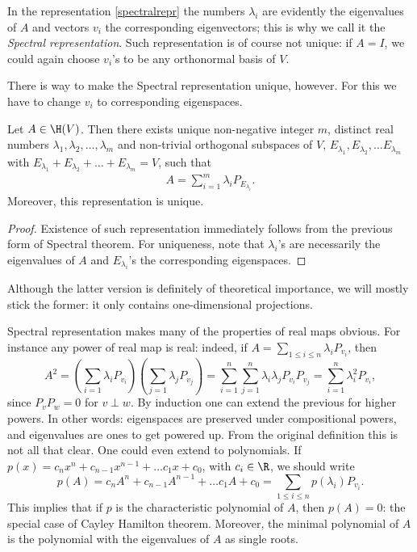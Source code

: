 In the representation \ref{spectralrepr} the numbers $\lambda_{i}$ are evidently the eigenvalues of $A$ and vectors $v_{i}$ the corresponding eigenvectors; this is why we call it the \textit{Spectral representation}. Such representation is of course not unique: if $A = I$, we could again choose $v_{i}$'s to be any orthonormal basis of $V$.

There is way to make the Spectral representation unique, however. For this we have to change $v_{i}$ to corresponding eigenspaces.

\begin{lause}
	Let $A \in \H(V)$. Then there exists unique non-negative integer $m$, distinct real numbers $\lambda_{1}, \lambda_{2}, \ldots, \lambda_{m}$ and non-trivial orthogonal subspaces of $V$, $E_{\lambda_{1}}, E_{\lambda_{2}}, \ldots E_{\lambda_{m}}$ with $E_{\lambda_{1}} + E_{\lambda_{2}} + \ldots + E_{\lambda_{m}} = V$, such that
	\begin{align*}\label{spectralrepr2}
		A = \sum_{i = 1}^{m} \lambda_{i} P_{E_{\lambda_{i}}}.
	\end{align*}
	Moreover, this representation is unique.
\end{lause}
\begin{proof}
	Existence of such representation immediately follows from the previous form of Spectral theorem. For uniqueness, note that $\lambda_{i}$'s are necessarily the eigenvalues of $A$ and $E_{\lambda_{i}}$'s the corresponding eigenspaces.
\end{proof}

Although the latter version is definitely of theoretical importance, we will mostly stick the former: it only contains one-dimensional projections.

Spectral representation makes many of the properties of real maps obvious. For instance any power of real map is real: indeed, if $A = \sum_{1 \leq i \leq n} \lambda_{i} P_{v_{i}}$, then
\[
	A^{2} = \left(\sum_{i = 1} \lambda_{i} P_{v_{i}}\right) \left(\sum_{j = 1} \lambda_{j} P_{v_{j}}\right) = \sum_{i = 1}^{n} \sum_{j = 1}^{n}\lambda_{i} \lambda_{j} P_{v_{i}} P_{v_{j}} = \sum_{i = 1}^{n} \lambda_{i}^2 P_{v_{i}},
\]
since $P_{v} P_{w} = 0$ for $v \perp w$. By induction one can extend the previous for higher powers. In other words: eigenspaces are preserved under compositional powers, and eigenvalues are ones to get powered up. From the original definition this is not all that clear. One could even extend to polynomials. If $p(x) = c_{n} x^{n} + c_{n- 1} x^{n - 1} + \ldots c_{1} x + c_{0}$, with $c_{i} \in \R$, we should write
\[
	p(A) = c_{n} A^{n} + c_{n - 1} A^{n - 1} + \ldots c_{1} A + c_{0} = \sum_{1 \leq i \leq n} p(\lambda_{i}) P_{v_{i}}.
\]
This implies that if $p$ is the characteristic polynomial of $A$, then $p(A) = 0$: the special case of Cayley Hamilton theorem. Moreover, the minimal polynomial of $A$ is the polynomial with the eigenvalues of $A$ as single roots.

